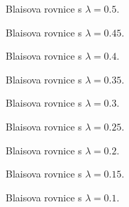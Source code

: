 
\begin{figure}[h]
	\centering
	\def\svgwidth{\textwidth}
	
	\caption{Blaisova rovnice s $\lambda = 0.5$.}
\end{figure}

\begin{figure}[h]
	\centering
	\def\svgwidth{\textwidth}
	
	\caption{Blaisova rovnice s $\lambda = 0.45$.}
\end{figure}

\begin{figure}[h]
	\centering
	\def\svgwidth{\textwidth}
	
	\caption{Blaisova rovnice s $\lambda = 0.4$.}
\end{figure}

\begin{figure}[h]
	\centering
	\def\svgwidth{\textwidth}
	
	\caption{Blaisova rovnice s $\lambda = 0.35$.}
\end{figure}

\begin{figure}[h]
	\centering
	\def\svgwidth{\textwidth}
	
	\caption{Blaisova rovnice s $\lambda = 0.3$.}
\end{figure}

\begin{figure}[h]
	\centering
	\def\svgwidth{\textwidth}
	
	\caption{Blaisova rovnice s $\lambda = 0.25$.}
\end{figure}

\begin{figure}[h]
	\centering
	\def\svgwidth{\textwidth}
	
	\caption{Blaisova rovnice s $\lambda = 0.2$.}
\end{figure}

\begin{figure}[h]
	\centering
	\def\svgwidth{\textwidth}
	
	\caption{Blaisova rovnice s $\lambda = 0.15$.}
\end{figure}

\begin{figure}[h]
	\centering
	\def\svgwidth{\textwidth}
	
	\caption{Blaisova rovnice s $\lambda = 0.1$.}
\end{figure}

